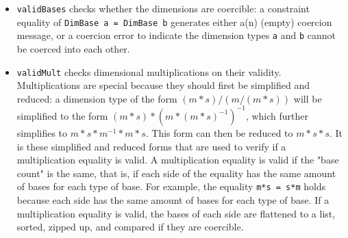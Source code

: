 \documentclass[a4paper,10pt]{article}
\begin{document}
\begin{itemize}
\begin{itemize}
		\item \texttt{validBases} checks whether the dimensions are coercible: a constraint equality of \texttt{DimBase a = DimBase b} generates either a(n) (empty) coercion message, or a coercion error to indicate the dimension types \texttt{a} and \texttt{b} cannot be coerced into each other.
		\item \texttt{validMult} checks dimensional multiplications on their validity. Multiplications are special because they should first be simplified and reduced: a dimension type of the form \texttt{$(m*s) / (m / (m*s))$} will be simplified to the form \texttt{$(m*s) * (m * (m*s)^{-1})^{-1}$}, which further simplifies to \texttt{$m*s*m^{-1}*m*s$}. This form can then be reduced to \texttt{$m*s*s$}. It is these simplified and reduced forms that are used to verify if a multiplication equality is valid.
		A multiplication equality is valid if the "base count" is the same, that is, if each side of the equality has the same amount of bases for each type of base. For example, the equality \texttt{m*s = s*m} holds because each side has the same amount of bases for each type of base. If a multiplication equality is valid, the bases of each side are flattened to a list, sorted, zipped up, and compared if they are coercible.
	\end{itemize}
		
\end{itemize}
\end{document}
